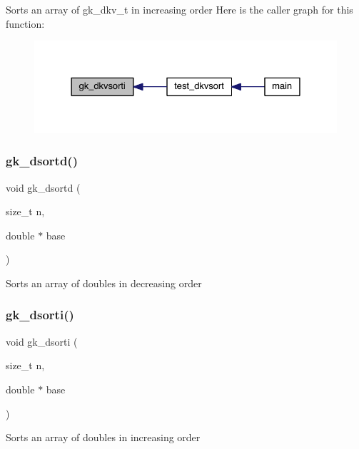 Sorts an array of gk\+\_\+dkv\+\_\+t in increasing order Here is the caller graph for this function\+:\nopagebreak
\begin{figure}[H]
\begin{center}
\leavevmode
\includegraphics[width=328pt]{a00140_aa7b778397ac67a5f9f61b0eaaec281f7_icgraph}
\end{center}
\end{figure}
\mbox{\label{a00140_afa2696ea8ea8ee66e5c2eb69e9ad4703}} 
\subsubsection{\texorpdfstring{gk\+\_\+dsortd()}{gk\_dsortd()}}
{\footnotesize\ttfamily void gk\+\_\+dsortd (\begin{DoxyParamCaption}\item[{size\+\_\+t}]{n,  }\item[{double $\ast$}]{base }\end{DoxyParamCaption})}

Sorts an array of doubles in decreasing order \mbox{\label{a00140_aedce2ad9d9cc3dc07260adb2cf843c62}} 
\subsubsection{\texorpdfstring{gk\+\_\+dsorti()}{gk\_dsorti()}}
{\footnotesize\ttfamily void gk\+\_\+dsorti (\begin{DoxyParamCaption}\item[{size\+\_\+t}]{n,  }\item[{double $\ast$}]{base }\end{DoxyParamCaption})}

Sorts an array of doubles in increasing order \mbox{\label{a00140_a0b1d86908a6e2acb384bc003e3bc40a0}} 
